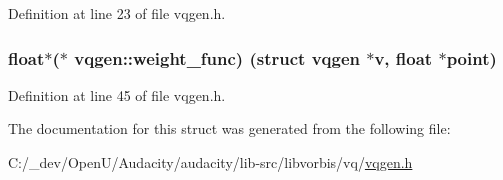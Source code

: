 Definition at line 23 of file vqgen.\+h.

\subsubsection[{\texorpdfstring{weight\+\_\+func}{weight_func}}]{\setlength{\rightskip}{0pt plus 5cm}float$\ast$($\ast$ vqgen\+::weight\+\_\+func) (struct {\bf vqgen} $\ast$v, float $\ast$point)}\hypertarget{structvqgen_a693e787b291fdbcb74e7952af63924b1}{}\label{structvqgen_a693e787b291fdbcb74e7952af63924b1}


Definition at line 45 of file vqgen.\+h.



The documentation for this struct was generated from the following file\+:\begin{DoxyCompactItemize}
\item 
C\+:/\+\_\+dev/\+Open\+U/\+Audacity/audacity/lib-\/src/libvorbis/vq/\hyperlink{vqgen_8h}{vqgen.\+h}\end{DoxyCompactItemize}
